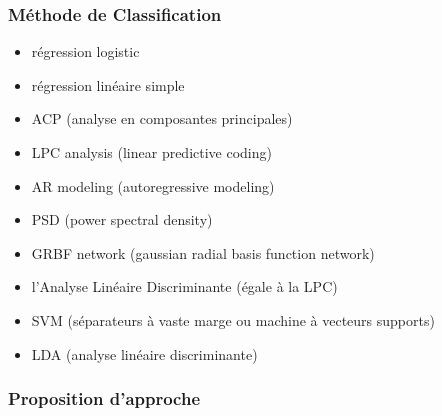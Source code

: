 \documentclass[12pt,]{article}
\providecommand{\tightlist}{%
  \setlength{\itemsep}{0pt}\setlength{\parskip}{0pt}}
\begin{document}
\hypertarget{muxe9thode-de-classification}{%
\subsubsection{Méthode de
Classification}\label{muxe9thode-de-classification}}

\begin{itemize}
\tightlist
\item
  régression logistic
\item
  régression linéaire simple
\item
  ACP (analyse en composantes principales)
\item
  LPC analysis (linear predictive coding)
\item
  AR modeling (autoregressive modeling)
\item
  PSD (power spectral density)
\item
  GRBF network (gaussian radial basis function network)
\item
  l'Analyse Linéaire Discriminante (égale à la LPC)
\item
  SVM (séparateurs à vaste marge ou machine à vecteurs supports)
\item
  LDA (analyse linéaire discriminante)
\end{itemize}

\hypertarget{proposition-dapproche}{%
\subsubsection{Proposition d'approche}\label{proposition-dapproche}}
\end{document}
